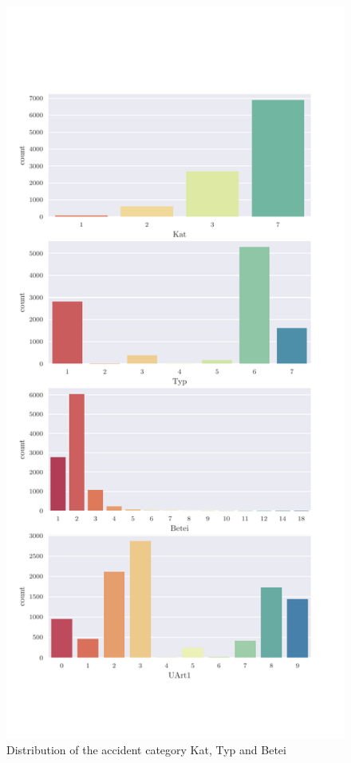 \begin{appendices}
    \begin{figure}[!ht]
        \centering
        \includegraphics[scale=1.0]{CorrAnalysis/data/BAYSIS/01_dataset/plots/baysis_dataset_count_multiple01}
        \caption{Distribution of the accident category Kat, Typ and Betei}
        \label{img:appendix_baysis_dataset_Kat}
        \label{img:appendix_baysis_dataset_Typ}
        \label{img:appendix_baysis_dataset_Betei}
        \label{img:appendix_baysis_dataset_UArt}
    \end{figure}


\end{appendices}
